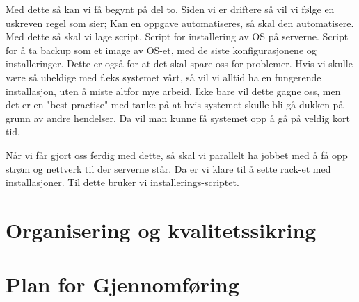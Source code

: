 \documentclass[12pt,a4paper]{article}
\begin{document}
Med dette så kan vi få begynt på del to. Siden vi er driftere så vil vi følge en uskreven regel som sier; Kan en oppgave automatiseres, så skal den automatisere.
Med dette så skal vi lage script. Script for installering av OS på serverne. Script for å ta backup som et image av OS-et, med de siste konfigurasjonene og installeringer.
Dette er også for at det skal spare oss for problemer. Hvis vi skulle være så uheldige med f.eks systemet vårt, så vil vi alltid ha en fungerende installasjon, uten å miste
altfor mye arbeid. Ikke bare vil dette gagne oss, men det er en "best practise" med tanke på at hvis systemet skulle bli gå dukken på grunn av andre hendelser. Da vil 
man kunne få systemet opp å gå på veldig kort tid. \newline \newline

Når vi får gjort oss ferdig med dette, så skal vi parallelt ha jobbet med å få opp strøm og nettverk til der serverne står. Da er vi klare
til å sette rack-et med installasjoner. Til dette bruker vi installerings-scriptet. 

\section{Organisering og kvalitetssikring}

\section{Plan for Gjennomføring}
\end{document}
